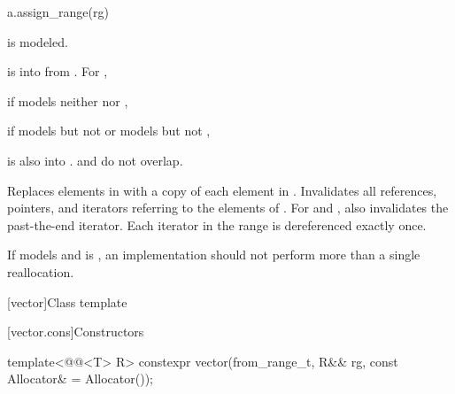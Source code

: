 \documentclass{wg21}
\begin{document}
\begin{itemdecl}
	a.assign_range(rg)
\end{itemdecl}

\begin{itemdescr}

\pnum
\mandates
{}
is modeled.

\pnum
\expects
{} is  into 
from .
For ,
\begin{removedblock}
if  models neither  nor ,
\end{removedblock}

\begin{addedblock}
if  models  but not  or models   but not ,
\end{addedblock}
 is also  into .
 and  do not overlap.

\pnum
\effects
Replaces elements in  with a copy of each element in .
Invalidates all references, pointers, and iterators
referring to the elements of .
For  and ,
also invalidates the past-the-end iterator.
Each iterator in the range  is dereferenced exactly once.

\begin{addedblock}
\recommended If  models 
and  is , an implementation
should not perform more than a single reallocation.
\end{addedblock}

\end{itemdescr}


[vector]{Class template }

[vector.cons]{Constructors}

%
\begin{itemdecl}
    template<@@<T> R>
    constexpr vector(from_range_t, R&& rg, const Allocator& = Allocator());
\end{itemdecl}
\end{document}
